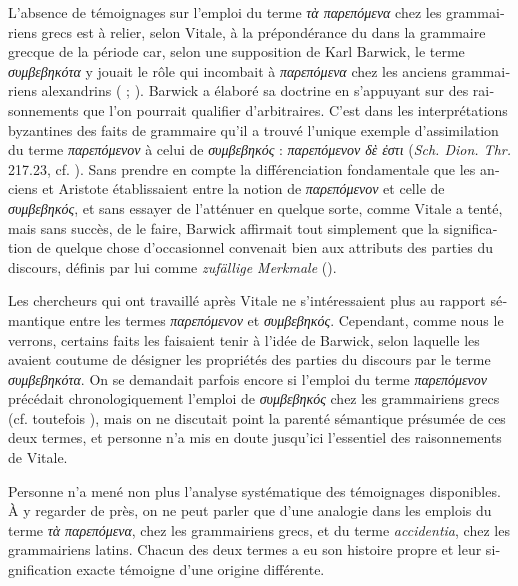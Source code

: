 \documentclass[french,output=paper,colorlinks,citecolor=brown]{../langscibook}
\begin{document}
\begin{otherlanguage}{french}
L’absence de témoignages sur l’emploi du terme \textit{τὰ παρεπόμενα} chez les grammairiens grecs est à relier, selon Vitale, à la prépondérance du   dans la grammaire grecque de la période car, selon une supposition de Karl Barwick, le terme \textit{συμβεβηκότα} y jouait le rôle qui incombait à \textit{παρεπόμενα} chez les anciens grammairiens alexandrins (\citealt[97, 107]{Barwick1922} ; \citeyear[48]{Barwick1957}). Barwick a élaboré sa doctrine en s’appuyant sur des raisonnements que l’on pourrait qualifier d’arbitraires. C’est dans les interprétations byzantines des faits de grammaire qu’il a trouvé l’unique exemple d’assimilation du terme \textit{παρεπόμενον} à celui de \textit{συμβεβηκός} : \textit{παρεπόμενον δὲ ἐστι}  (\textit{Sch. Dion. Thr.} 217.23, cf. \citealt[47]{Barwick1957}). Sans prendre en compte la différenciation fondamentale que les  anciens et Aristote établissaient entre la notion de \textit{παρεπόμενον} et celle de \textit{συμβεβηκός}, et sans essayer de l’atténuer en quelque sorte, comme Vitale a tenté, mais sans succès, de le faire, Barwick affirmait tout simplement que la signification de quelque chose d’occasionnel convenait bien aux attributs des parties du discours, définis par lui comme \textit{zufällige Merkmale} (\citealt[48]{Barwick1957}). 

Les chercheurs qui ont travaillé après Vitale ne s’intéressaient plus au rapport sémantique entre les termes \textit{παρεπόμενον} et \textit{συμβεβηκός}. Cependant, comme nous le verrons, certains faits les faisaient tenir à l’idée de Barwick, selon laquelle les  avaient coutume de désigner les propriétés des parties du discours par le terme \textit{συμβεβηκότα}. On se demandait parfois encore si l’emploi du terme \textit{παρεπόμενον} précédait chronologiquement l’emploi de \textit{συμβεβηκός} chez les grammairiens grecs (cf. toutefois \citealt[154--155]{DeJonge2008}), mais on ne discutait point la parenté sémantique présumée de ces deux termes, et personne n’a mis en doute jusqu’ici l’essentiel des raisonnements de Vitale. 

Personne n’a mené non plus l’analyse systématique des témoignages disponibles. À y regarder de près, on ne peut parler que d’une analogie dans les emplois du terme \textit{τὰ παρεπόμενα}, chez les grammairiens grecs, et du terme \textit{accidentia}, chez les grammairiens latins. Chacun des deux termes a eu son histoire propre et leur signification exacte témoigne d’une origine différente.


\end{otherlanguage}
\end{document}
